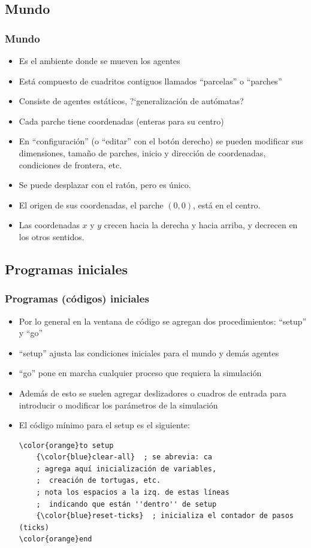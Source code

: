 \documentclass{beamer}
\begin{document}
\subsection{Mundo}
\begin{frame}[t]
\frametitle{Mundo}
\begin{itemize}[<+-| alert@+>]
	\item Es el ambiente donde se mueven los agentes
	\item Está compuesto de cuadritos contiguos llamados ``parcelas'' o ``parches''
	\item Consiste de agentes estáticos, ?`generalización de autómatas?
	\item Cada parche tiene coordenadas (enteras para su centro)
	\item En ``configuración'' (o ``editar'' con el botón derecho) se pueden modificar sus dimensiones, tamaño de parches, inicio y dirección de coordenadas, condiciones de frontera, etc.
	\item Se puede desplazar con el ratón, pero es único.
	\item El origen de sus coordenadas, el parche $(0,0)$, está en el centro.
	\item Las coordenadas $x$ y $y$ crecen hacia la derecha y hacia arriba, y decrecen en los otros sentidos.
\end{itemize}
\end{frame}


\subsection{Programas iniciales}
\begin{frame}[fragile]
\frametitle{Programas (códigos) iniciales}
\begin{itemize}[<+->]
	\item Por lo general en la ventana de código se agregan dos procedimientos: ``setup'' y ``go''
	\item ``setup'' ajusta las condiciones iniciales para el mundo y demás agentes
	\item ``go'' pone en marcha cualquier proceso que requiera la simulación
	\item Además de esto se suelen agregar deslizadores o cuadros de entrada para introducir o modificar los parámetros de la simulación
	\item El código mínimo para el setup es el siguiente:
\begin{Verbatim}[commandchars=\\\{\}]
\color{orange}to setup
    {\color{blue}clear-all}  ; se abrevia: ca
    ; agrega aquí inicialización de variables,
    ;  creación de tortugas, etc.
    ; nota los espacios a la izq. de estas líneas
    ;  indicando que están ''dentro'' de setup
    {\color{blue}reset-ticks}  ; inicializa el contador de pasos (ticks)
\color{orange}end
\end{Verbatim}
\end{itemize}
\end{frame}
\end{document}
